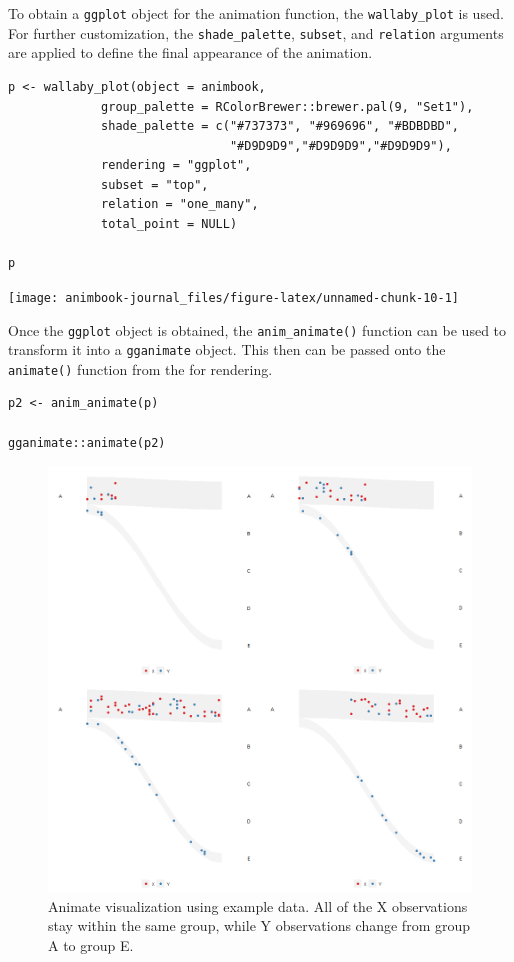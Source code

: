 To obtain a \texttt{ggplot} object for the animation function, the \texttt{wallaby\_plot} is used. For further customization, the \texttt{shade\_palette}, \texttt{subset}, and \texttt{relation} arguments are applied to define the final appearance of the animation.

\begin{verbatim}
p <- wallaby_plot(object = animbook,
             group_palette = RColorBrewer::brewer.pal(9, "Set1"),
             shade_palette = c("#737373", "#969696", "#BDBDBD",
                               "#D9D9D9","#D9D9D9","#D9D9D9"),
             rendering = "ggplot",
             subset = "top",
             relation = "one_many",
             total_point = NULL)

p
\end{verbatim}

\begin{center}\texttt{[image: animbook-journal\_files/figure-latex/unnamed-chunk-10-1]} \end{center}

Once the \texttt{ggplot} object is obtained, the \texttt{anim\_animate()} function can be used to transform it into a \texttt{gganimate} object. This then can be passed onto the \texttt{animate()} function from the  for rendering.

\begin{verbatim}
p2 <- anim_animate(p)

gganimate::animate(p2)
\end{verbatim}

\begin{figure}

{\centering \includegraphics[width=1\linewidth]{figures/animation-example} 

}

\caption{Animate visualization using example data. All of the X observations stay within the same group, while Y observations change from group A to group E.}\label{fig:catchange-figure}
\end{figure}

